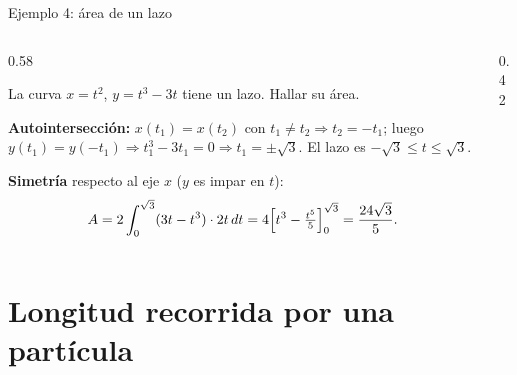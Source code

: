 \documentclass[10pt,aspectratio=169]{beamer}
\begin{document}
\begin{frame}{Ejemplo 4: área de un lazo}
  \begin{columns}
    \begin{column}{0.58\textwidth}
      \begin{ejemplo}
        La curva $x=t^2$, $y=t^3-3t$ tiene un lazo. Hallar su área.

        \textbf{Autointersección:} $x(t_1)=x(t_2)$ con $t_1\ne t_2\Rightarrow t_2=-t_1$; luego
        $y(t_1)=y(-t_1)\Rightarrow t_1^3-3t_1=0\Rightarrow t_1=\pm\sqrt3$. El lazo es $-\sqrt3\le t\le\sqrt3$.

        \textbf{Simetría} respecto al eje $x$ ($y$ es impar en $t$):
        \[ A=2\int_0^{\sqrt3}(3t-t^3)\cdot2t\,dt=4\Big[t^3-\tfrac{t^5}{5}\Big]_0^{\sqrt3}=\frac{24\sqrt3}{5}. \]
      \end{ejemplo}
    \end{column}
    \begin{column}{0.42\textwidth}
      \centering
    \end{column}
  \end{columns}
\end{frame}

\section{Longitud recorrida por una partícula}
\end{document}
